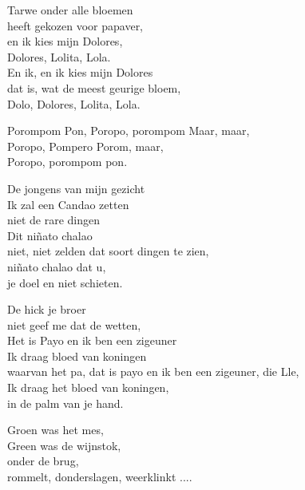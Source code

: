 \clearpage
\begin{translation}
Tarwe onder alle bloemen\\
heeft gekozen voor papaver,\\
en ik kies mijn Dolores,\\
Dolores, Lolita, Lola.\\
En ik, en ik kies mijn Dolores\\
dat is, wat de meest geurige bloem,\\
Dolo, Dolores, Lolita, Lola.\vspace{\wlskip}

Porompom Pon, Poropo, porompom Maar, maar,\\
Poropo, Pompero Porom, maar,\\
Poropo, porompom pon.\vspace{\wlskip}

De jongens van mijn gezicht\\
Ik zal een Candao zetten\\
niet de rare dingen\\
Dit niñato chalao\\
niet, niet zelden dat soort dingen te zien,\\
niñato chalao dat u,\\
je doel en niet schieten.\vspace{\wlskip}

De hick je broer\\
niet geef me dat de wetten,\\
Het is Payo en ik ben een zigeuner\\
Ik draag bloed van koningen\\
waarvan het pa, dat is payo en ik ben een zigeuner, die Lle,\\
Ik draag het bloed van koningen,\\
in de palm van je hand.\vspace{\wlskip}

Groen was het mes,\\
Green was de wijnstok,\\
onder de brug,\\
rommelt, donderslagen, weerklinkt ....
\end{translation}
